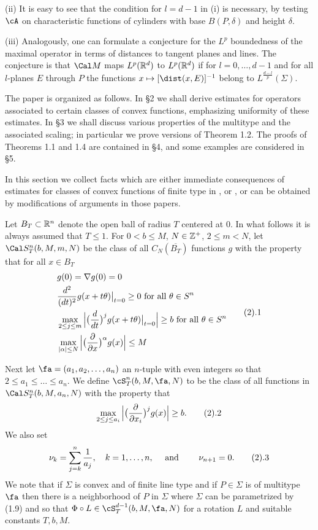 (ii) It is easy
to see that the condition for $l=d-1$
in (i) is necessary, by testing $\cA$ 
on characteristic functions of cylinders 
with base $B(P,\delta)$ and height $\delta$. 

(iii) Analogously, one can formulate a conjecture for 
 the $L^p$ boundedness of the maximal operator in terms of  
distances to tangent planes and lines. The conjecture is that ${\Cal M}$ 
maps $L^p({\Bbb R}^d)$ to $L^p({\Bbb R}^d)$ if for
$l=0, \dots, d-1$ and for all $l$-planes $E$ through $P$ 
the functions $x\mapsto [\dist(x,E)]^{-1}$ belong to
$L^{\frac{d-l}{p}}(\Sigma)$. 

\endremark



The paper is organized as follows. In \S2 we shall derive estimates for operators associated 
to certain classes of convex functions, 
emphasizing  uniformity of
 these estimates. In \S3 we shall discuss various properties of the multitype 
and the associated scaling; in particular we prove  versions of Theorem 1.2.
The proofs of Theorems 1.1 and 1.4 are contained in \S4, and some examples 
are considered in \S5.


\endhead

In this section we collect facts which are either immediate consequences
of estimates
for classes of  convex functions 
of finite type in  \cite{2}, \cite{9} or \cite{18}, or can be 
obtained by modifications of arguments in those papers.

 
Let $B_{T}\subset \Bbb R^{n}$  denote the open ball  
of radius $T$ centered at $0$. In what follows it is always assumed that 
$T\le 1$.
For $0<b\le M$,  $N\in\Bbb Z^+$, $2\le m< N$,  let
 $\Cal S_T^n(b,M, m,N)$ be the class of all $C_N(\overline{B_T})$ functions $g$
 with the property
that for all $x\in B_T$
$$
\aligned
&g(0)=\nabla g(0)=0
\\
&\frac{d^2}{(dt)^2} g(x+t\theta)\big|_{t=0}\ge 0 \text{ for all }
\theta\in S^{n} 
\\
&\max_{2\le j\le m} \Big|\big(\frac {d}{dt}\big)^j g(x+t\theta)
\big|_{t=0}\Big|\ge 
b \text{ for all }
\theta\in S^{n} 
\\
& \max_{|\alpha|\le N} \Big|\big(\frac{\partial}{\partial x}
\big)^\alpha g(x)\Big|\le M
\endaligned
\tag 2.1
$$


Next let $\fa=(a_1, a_2,\dots, a_n)$ an $n$-tuple with even integers
so that
$2\le a_1\le \dots\le a_n$.
We define
 $\cS_T^n(b,M, \fa,N)$ to
 be the class of all functions in
 $\Cal S_T^n(b,M, a_n,N)$ with the property that
$$
\max_{2\le j\le a_i} \Big|\big(\frac {\partial}{\partial x_i}\big)^j g(x)
\Big|\ge b .
\tag 2.2
$$
We also set
$$\nu_k=\sum_{j=k}^{n}\frac 1{a_j}, \quad k=1,\dots, n,
\quad\text{ and }\qquad\nu_{n+1}=0.
\tag 2.3
$$
We note that if $\Sigma$ is convex and of finite line type
and if $P\in \Sigma$ is of multitype $\fa$ then 
there is a neighborhood of $P$ in $\Sigma$ where 
$\Sigma$ can be parametrized by (1.9) and so that $\Phi\circ L
\in\cS^{d-1}_T(b,M,\fa,N)$  for a  rotation $L$ and suitable constants
$T,b,M$.

